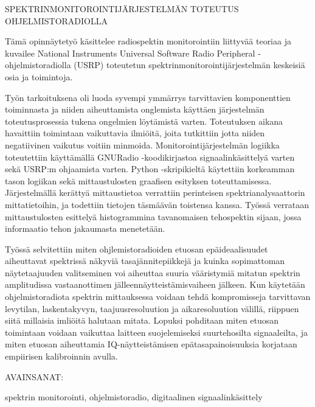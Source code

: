 \vspace{7mm}
{\huge SPEKTRINMONITOROINTIJÄRJESTELMÄN TOTEUTUS OHJELMISTORADIOLLA \par}

\vspace{7mm}

Tämä opinnäytetyö käsittelee radiospektin monitorointiin liittyvää teoriaa
ja kuvailee National Instruments Universal Software Radio Peripheral -ohjelmistoradiolla (USRP)
toteutetun spektrinmonitorointijärjestelmän keskeisiä osia ja toimintoja.

Työn tarkoituksena oli luoda syvempi ymmärrys tarvittavien komponenttien toiminnasta ja
niiden aiheuttamista onglemista käyttäen järjestelmän toteutusprosessia tukena ongelmien löytämistä varten.
Toteutuksen aikana havaittiin toimintaan vaikuttavia ilmiöitä, joita tutkittiin jotta niiden negatiivinen vaikutus voitiin
minmoida. Monitorointijärjestelmän logiikka toteutettiin käyttämällä GNURadio -koodikirjastoa signaalinkäsittelyä varten sekä
USRP:m ohjaamista varten. Python -skripikieltä käytettiin korkeamman tason logiikan sekä mittaustulosten graafisen esityksen toteuttamisessa.
Järjestelmällä kerättyä mittaustietoa verrattiin perinteisen spektrianalysaattorin mittatietoihin,
ja todettiin tietojen täsmäävän toistensa kanssa. Työssä verrataan mittaustulosten esittelyä
histogrammina tavanomaisen tehospektin sijaan, jossa informaatio tehon jakaumasta menetetään.

Työssä selvitettiin miten ohjlemistoradioiden etuosan epäideaalisuudet aiheuttavat spektrissä näkyviä tasajännitepiikkejä ja
kuinka sopimattoman näytetaajuuden valitseminen voi aiheuttaa suuria vääristymiä mitatun spektrin
amplitudissa vastaanottimen jälleennäytteistämisvaiheen jälkeen. Kun käytetään ohjelmistoradiota spektrin mittauksessa voidaan tehdä kompromisseja
tarvittavan levytilan, laskentakyvyn, taajuusresoluution ja aikaresoluution välillä, riippuen siitä
millaisia imliöitä halutaan mitata. Lopuksi pohditaan miten etuosan
toimintaan voidaan vaikuttaa laitteen suojelemiseksi suurtehosilta signaaleilta,
ja miten etuosan aiheuttamia IQ-näytteistämisen epätasapainoisuuksia korjataan
empiirisen kalibroinnin avulla.

\vspace{25mm}

AVAINSANAT:

spektrin monitorointi, ohjelmistoradio, digitaalinen signaalinkäsittely
